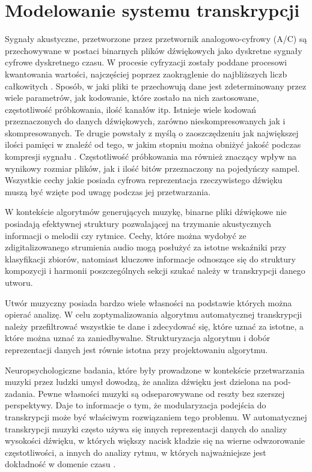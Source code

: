 \documentclass[12pt,a4paper,twoside]{mwart}
\begin{document}
\section{Modelowanie systemu transkrypcji} \label{sec:modelowanieSystemu}
Sygnały akustyczne, przetworzone przez przetwornik analogowo-cyfrowy (A/C) są przechowywane w postaci binarnych plików dźwiękowych jako dyskretne sygnały cyfrowe dyskretnego czasu. W procesie cyfryzacji zostały poddane procesowi kwantowania wartości, najczęściej poprzez zaokrąglenie do najbliższych liczb całkowitych \cite[1-4]{CyfrowePrzetwarzanieSygnalowOdTeoriiDoZastosowan}. Sposób, w jaki pliki te przechowują dane jest zdeterminowany przez wiele parametrów, jak kodowanie, które zostało na nich zastosowane, częstotliwość próbkowania, ilość kanałów itp. Istnieje wiele kodowań przeznaczonych do danych dźwiękowych, zarówno nieskompresowanych jak i skompresowanych. Te drugie powstały z myślą o zaoszczędzeniu jak największej ilości pamięci w znaleźć od tego, w jakim stopniu można obniżyć jakość podczas kompresji sygnału \cite[66]{Homerecording:DlaKazdego}. Częstotliwość próbkowania ma również znaczący wpływ na wynikowy rozmiar plików, jak i ilość bitów przeznaczony na pojedyńczy sampel. Wszystkie cechy jakie posiada cyfrowa reprezentacja rzeczywistego dźwięku muszą być wzięte pod uwagę podczas jej przetwarzania.

W kontekście algorytmów generujących muzykę, binarne pliki dźwiękowe nie posiadają efektywnej struktury pozwalającej na trzymanie akustycznych informacji o melodii czy rytmice. Cechy, które można wydobyć ze zdigitalizowanego strumienia audio mogą posłużyć za istotne wskaźniki przy klasyfikacji zbiorów, natomiast kluczowe informacje odnoszące się do struktury kompozycji i harmonii poszczególnych sekcji szukać należy w transkrypcji danego utworu. 

Utwór muzyczny posiada bardzo wiele własności na podstawie których można opierać analizę. W celu zoptymalizowania algorytmu automatycznej transkrypcji należy przefiltrować wszystkie te dane i zdecydować się, które uznać za istotne, a które można uznać za zaniedbywalne. Strukturyzacja algorytmu i dobór reprezentacji danych jest równie istotna przy projektowaniu algorytmu.

Neuropsychologiczne badania, które były prowadzone w kontekście przetwarzania muzyki przez ludzki umysł dowodzą, że analiza dźwięku jest dzielona na pod-zadania. Pewne własności muzyki są odseparowywane od reszty bez szerszej perspektywy. Daje to informacje o tym, że modularyzacja podejścia do transkrypcji może być właściwym rozwiązaniem tego problemu. W automatycznej transkrypcji muzyki często używa się innych reprezentacji danych do analizy wysokości dźwięku, w których większy nacisk kładzie się na wierne odwzorowanie częstotliwości, a innych do analizy rytmu, w których najważniejsze jest dokładność w domenie czasu \cite[37-46]{Transcription:Zatorre:AuditoryCortex}\cite[231-246]{Transcription:Tervaniemi:AuditoryCortexFunctions}.
\end{document}
